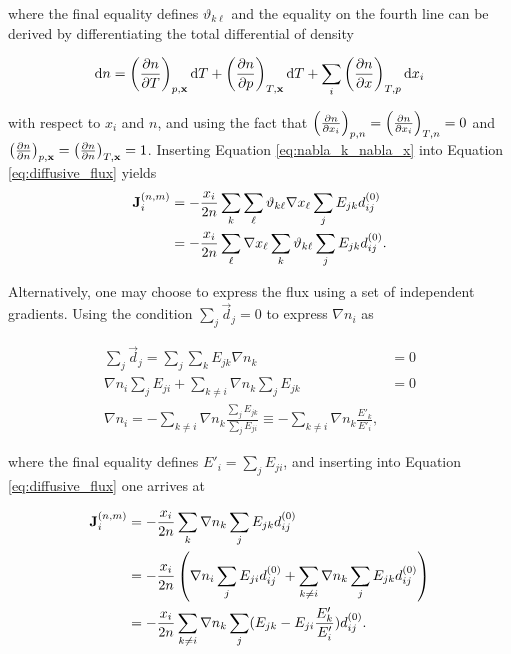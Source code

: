 where the final equality defines $\vartheta_{k \ell}$ and the equality on the fourth line can be derived by differentiating the total differential of density

\begin{equation}
    \mathrm{d} n = \left(\frac{\partial n}{\partial T}\right)_{p, \boldsymbol{\mathrm{x}}} \mathrm{d} T + \left(\frac{\partial n}{\partial p}\right)_{T, \boldsymbol{\mathrm{x}}} \mathrm{d} T + \sum_i \left(\frac{\partial n}{\partial x}\right)_{T, p} \mathrm{d} x_i
\end{equation}

with respect to $x_i$ and $n$, and using the fact that $\left(\frac{\partial n}{\partial x_i}\right)_{p, n} = \left(\frac{\partial n}{\partial x_i}\right)_{T, n} = 0$ and $\left(\frac{\partial n}{\partial n}\right)_{p, \boldsymbol{\mathrm{x}}} = \left(\frac{\partial n}{\partial n}\right)_{T, \boldsymbol{\mathrm{x}}} = 1$. Inserting Equation \eqref{eq:nabla_k_nabla_x} into Equation \eqref{eq:diffusive_flux} yields
\begin{equation}
    \begin{split}
        \boldsymbol{\mathrm{J}}^{(n,m)}_i &= - \frac{x_i}{2n}\sum_k \sum_{\ell} \vartheta_{k \ell} \nabla x_\ell \sum_j E_{jk} d_{ij}^{(0)}\\
        &= - \frac{x_i}{2n} \sum_\ell \nabla x_\ell \sum_{k} \vartheta_{k \ell} \sum_{j} E_{jk} d_{ij}^{(0)}.
    \end{split}
\end{equation}

Alternatively, one may choose to express the flux using a set of independent gradients. Using the condition $\sum_j \Vec{d}_j = 0$ to express $\nabla n_i$ as 

\begin{equation}
    \begin{split}
        \sum_j \Vec{d}_j = \sum_j \sum_k E_{jk}\nabla n_k &= 0\\
        \nabla n_i \sum_j E_{ji} + \sum_{k \neq i} \nabla n_k \sum_j E_{jk} &= 0\\
        \nabla n_i = - \sum_{k \neq i} \nabla n_k \frac{\sum_j E_{jk}}{\sum_j E_{ji}} \equiv - \sum_{k \neq i} \nabla n_k \frac{E'_k}{E'_i},
    \end{split}
    \label{eq:molar_grad_relation}
\end{equation}

where the final equality defines $E'_i = \sum_{j} E_{ji}$, and inserting into Equation \eqref{eq:diffusive_flux} one arrives at

\begin{equation}
    \begin{split}
        \boldsymbol{\mathrm{J}}^{(n,m)}_i &= - \frac{x_i}{2n}\sum_k \nabla n_k \sum_j E_{jk} d_{ij}^{(0)} \\
        &= - \frac{x_i}{2n} \left( \nabla n_i \sum_j E_{ji} d_{ij}^{(0)} + \sum_{k \neq i} \nabla n_k \sum_j E_{jk} d_{ij}^{(0)} \right) \\
        &= - \frac{x_i}{2n}\sum_{k \neq i} \nabla n_k \sum_j (E_{jk} - E_{ji} \frac{E'_k}{E'_i}) d_{ij}^{(0)}.
    \end{split}
    \label{eq:diff_fluxforce_3}
\end{equation}

